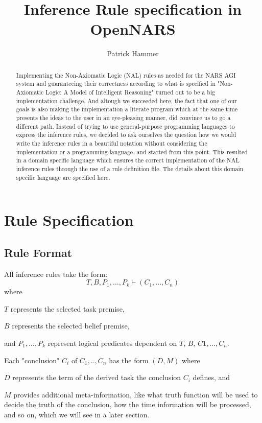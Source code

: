 \documentclass{article}
\title{Inference Rule specification in OpenNARS}
\author{Patrick Hammer}
\begin{document}
\maketitle

\tableofcontents

\begin{abstract}
Implementing the Non-Axiomatic Logic (NAL) rules as needed for the NARS AGI system and guaranteeing their correctness according to what is specified in "Non-Axiomatic Logic: A Model of Intelligent Reasoning" \cite{wp:book2} turned out to be a big implementation challenge. And altough we succeeded here, the fact that one of our goals is also making the implementation a literate program which at the same time presents the ideas to the user in an eye-pleasing manner, did convince us to go a different path. Instead of trying to use general-purpose programming languages to express the inference rules, we decided to ask ourselves the question how we would write the inference rules in a beautiful notation without considering the implementation or a programming language, and started from this point. This resulted in a domain specific language which ensures the correct implementation of the NAL inference rules through the use of a rule definition file. The details about this domain specific language are specified here.

\end{abstract}

\section{Rule Specification}

\subsection{Rule Format}

All inference rules take the form:
$$T, B, P_1, ..., P_k \vdash (C_1,...,C_n)$$
where

$T$ represents the selected task premise,

$B$ represents the selected belief premise,

and $P_1, ..., P_k$ represent logical predicates dependent on $T$, $B$, $C1, ..., C_n$.

Each "conclusion" $C_i$ of $C_1, .., C_n$ has the form $(D,M)$
where

$D$ represents the term of the derived task the conclusion $C_i$ defines, and

$M$ provides additional meta-information, like what truth function will be used to decide the truth of the conclusion, how the time information will be processed, and so on, which we will see in a later section.
\end{document}
